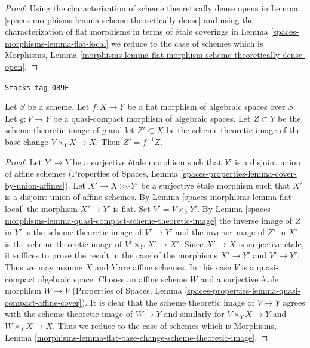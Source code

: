 \begin{proof}
Using the characterization of scheme theoretically dense opens
in Lemma \ref{spaces-morphisms-lemma-scheme-theoretically-dense}
and using the characterization of flat morphisms in terms of
\'etale coverings in Lemma \ref{spaces-morphisms-lemma-flat-local}
we reduce to the case of schemes which is
Morphisms, Lemma
\ref{morphisms-lemma-flat-morphism-scheme-theoretically-dense-open}.
\end{proof}

\begin{lemma}
\label{spaces-morphisms-lemma-flat-base-change-scheme-theoretic-image}
\href{https://stacks.math.columbia.edu/tag/089E}{\texttt{Stacks tag 089E}}

Let $S$ be a scheme. Let $f : X \to Y$ be a flat morphism of algebraic spaces
over $S$. Let $g : V \to Y$ be a quasi-compact morphism of algebraic spaces.
Let $Z \subset Y$ be the scheme theoretic image of $g$ and let $Z' \subset X$
be the scheme theoretic image of the base change $V \times_Y X \to X$.
Then $Z' = f^{-1}Z$.
\end{lemma}

\begin{proof}
Let $Y' \to Y$ be a surjective \'etale morphism such that $Y'$ is a
disjoint union of affine schemes (Properties of Spaces,
Lemma \ref{spaces-properties-lemma-cover-by-union-affines}).
Let $X' \to X \times_Y Y'$ be a surjective \'etale morphism such
that $X'$ is a disjoint union of affine schemes.
By Lemma \ref{spaces-morphisms-lemma-flat-local} the morphism $X' \to Y'$ is flat.
Set $V' = V \times_Y Y'$.
By Lemma \ref{spaces-morphisms-lemma-quasi-compact-scheme-theoretic-image}
the inverse image of $Z$ in $Y'$ is the scheme theoretic
image of $V' \to Y'$ and the inverse image of $Z'$ in $X'$
is the scheme theoretic image of $V' \times_{Y'} X' \to X'$.
Since $X' \to X$ is surjective \'etale, it suffices to prove
the result in the case of the morphisms $X' \to Y'$ and $V' \to Y'$.
Thus we may assume $X$ and $Y$ are affine schemes.
In this case $V$ is a quasi-compact algebraic space.
Choose an affine scheme $W$ and a surjective \'etale morphism
$W \to V$ (Properties of Spaces, Lemma
\ref{spaces-properties-lemma-quasi-compact-affine-cover}).
It is clear that the scheme theoretic image of $V \to Y$
agrees with the scheme theoretic image of $W \to Y$ and
similarly for $V \times_Y X \to Y$ and $W \times_Y X \to X$.
Thus we reduce to the case of schemes which is
Morphisms, Lemma
\ref{morphisms-lemma-flat-base-change-scheme-theoretic-image}.
\end{proof}

